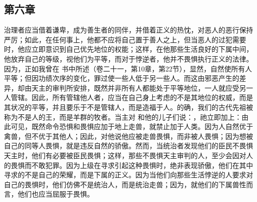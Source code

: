 
\subsection{第六章}

\par

治理者应当借着谦卑，成为善生者的同伴，并借着正义的热忱，对恶人的恶行保持严厉；如此，在任何事上，他都不应将自己置于善人之上，但当恶人的过犯需要时，他应立即意识到自己优先地位的权能；这样，在他那些生活良好的下属中间，他放弃自己的等级，视他们为平等，而对于悖逆者，他并不畏惧执行正义的法律。因为，正如我曾在  书中所述（卷二十一，第10章，第22节），显然，自然使所有人平等；但因功绩次序的变化，罪过使一些人低于另一些人。而这由邪恶产生的差异，却由天主的审判所安排，既然并非所有人都能处于平等地位，一人就应受另一人管辖。因此，所有管辖他人者，应当在自己身上考虑的不是其地位的权威，而是其状况的平等，并且要乐于不是管辖人，而是造福于人。的确，我们的古代先祖被称为不是人的王，而是羊群的牧者。当主对  和他的儿子们说：，祂立即加上：由此可见，既然命令恐惧和畏惧应加于地上走兽，就禁止加于人类。因为人自然优于禽兽，但不优于其他人；因此，对他说他应被走兽畏惧，而非被人畏惧；因为想被自己的同等人畏惧，就是违反自然的骄傲。然而，当统治者发现他们的臣民不畏惧天主时，他们有必要被臣民畏惧；这样，那些不畏惧天主审判的人，至少会因对人的畏惧而不敢犯罪。因为上级在寻求引起这种畏惧时，绝非表现骄傲，他们在其中寻求的不是自己的荣耀，而是下属的正义。因为当他们向那些生活悖逆的人要求对自己的畏惧时，他们仿佛不是统治人，而是统治走兽；因为，就他们的下属兽性而言，他们也应当屈服于畏惧。\par

